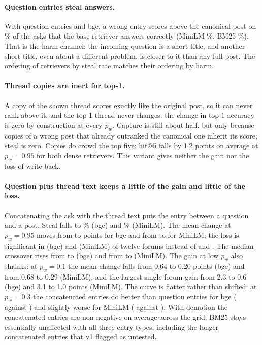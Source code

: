 \documentclass[11pt]{article}
\begin{document}
\paragraph{Question entries steal answers.} With question entries and bge, a wrong entry scores above the canonical post on \stealBgeAsk\% of the asks that the base retriever answers correctly (MiniLM \stealMiniAsk\%, BM25 \stealBmAsk\%). That is the harm channel: the incoming question is a short title, and another short title, even about a different problem, is closer to it than any full post. The ordering of retrievers by steal rate matches their ordering by harm.

\paragraph{Thread copies are inert for top-1.} A copy of the shown thread scores exactly like the original post, so it can never rank above it, and the top-1 thread never changes: the change in top-1 accuracy is zero by construction at every $p_w$. Capture is still about half, but only because copies of a wrong post that already outranked the canonical one inherit its score; steal is zero. Copies do crowd the top five: hit@5 falls by 1.2 points on average at $p_w=0.95$ for both dense retrievers. This variant gives neither the gain nor the loss of write-back.

\paragraph{Question plus thread text keeps a little of the gain and little of the loss.} Concatenating the ask with the thread text puts the entry between a question and a post. Steal falls to \stealBgeAskdoc\% (bge) and \stealMiniAskdoc\% (MiniLM). The mean change at $p_w=0.95$ moves from \dNNBgeAsk{} to \dNNBgeAskdoc{} points for bge and from \dNNMiniAsk{} to \dNNMiniAskdoc{} for MiniLM; the loss is significant in \negBgeAskdoc{} (bge) and \negMiniAskdoc{} (MiniLM) of twelve forums instead of \negBgeAsk{} and \negMiniAsk{}. The median crossover rises from \medBgeAsk{} to \medBgeAskdoc{} (bge) and from \medMiniAsk{} to \medMiniAskdoc{} (MiniLM). The gain at low $p_w$ also shrinks: at $p_w=0.1$ the mean change falls from 0.64 to 0.20 points (bge) and from 0.68 to 0.29 (MiniLM), and the largest single-forum gain from 2.3 to 0.6 (bge) and 3.1 to 1.0 points (MiniLM). The curve is flatter rather than shifted: at $p_w=0.3$ the concatenated entries do better than question entries for bge (\dThBgeAskdoc{} against \dThBgeAsk) and slightly worse for MiniLM (\dThMiniAskdoc{} against \dThMiniAsk). With demotion the concatenated entries are non-negative on average across the grid. BM25 stays essentially unaffected with all three entry types, including the longer concatenated entries that v1 flagged as untested.
\end{document}
